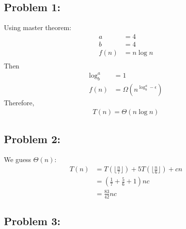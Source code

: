 \documentclass{article}
\newcommand\floor[1]{\lfloor#1\rfloor}
\begin{document}
 

\hypertarget{}{}
\subsection*{{Problem 1: }}
\label{}
Using master theorem: \\
\begin{align*} 
a &=4 \\ 
b &= 4 \\ 
f(n) &= n\log{n} \\
\end{align*} 
Then \begin{align*} 
\log_b^a & = 1\\
f(n) &= \Omega(n^{\log_b^a-\epsilon})  
\end{align*} 
Therefore, \begin{align*} T(n) = \Theta(n\log{n}) \end{align*} 

\hypertarget{}{}
\subsection*{{Problem 2: }}
We guess $\Theta(n) $: 
\begin{align*} 
T(n) & = T(\floor{\frac{n}{7}}) + 5T(\floor{\frac{n}{6}}) + cn \\
	& = \left( \frac{1}{7} + \frac{5}{6}  + 1 \right) nc \\
	& = \frac{83}{42} nc 
\end{align*} 

\hypertarget{}{}
\subsection*{{Problem 3: }}
\end{document}
